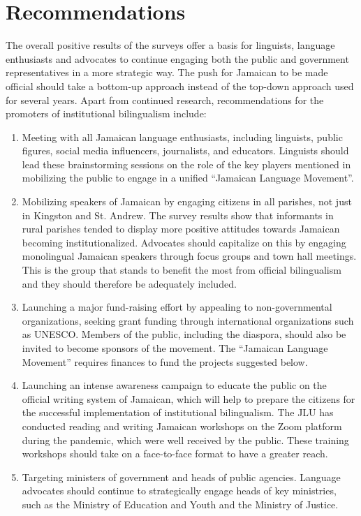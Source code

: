 \documentclass[output=paper,colorlinks,citecolor=brown]{langscibook}
\begin{document}
\section{Recommendations}

The overall positive results of the surveys offer a basis for linguists, language enthusiasts and advocates to continue engaging both the public and government representatives in a more strategic way. The push for Jamaican to be made official should take a bottom-up approach instead of the top-down approach used for several years. Apart from continued research, recommendations for the promoters of institutional bilingualism include:

\begin{enumerate}
    \item Meeting with all Jamaican language enthusiasts, including linguists, public figures, social media influencers, journalists, and educators. Linguists should lead these brainstorming sessions on the role of the key players mentioned in mobilizing the public to engage in a unified “Jamaican Language Movement”.  

    \item Mobilizing speakers of Jamaican by engaging citizens in all parishes, not just in Kingston and St. Andrew. The survey results show that informants in rural parishes tended to display more positive attitudes towards Jamaican becoming institutionalized. Advocates should capitalize on this by engaging monolingual Jamaican speakers through focus groups and town hall meetings. This is the group that stands to benefit the most from official bilingualism and they should therefore be adequately included.

    \item Launching a major fund-raising effort by appealing to non-governmental organizations, seeking grant funding through international organizations such as UNESCO. Members of the public, including the diaspora, should also be invited to become sponsors of the movement. The “Jamaican Language Movement” requires finances to fund the projects suggested below.  

    \item Launching an intense awareness campaign to educate the public on the official writing system of Jamaican, which will help to prepare the citizens for the successful implementation of institutional bilingualism. The JLU has conducted reading and writing Jamaican workshops on the Zoom platform during the pandemic, which were well received by the public. These training workshops should take on a face-to-face format to have a greater reach. 

    \item Targeting ministers of government and heads of public agencies. Language advocates should continue to strategically engage heads of key ministries, such as the Ministry of Education and Youth and the Ministry of Justice. 
\end{enumerate}
\end{document}
